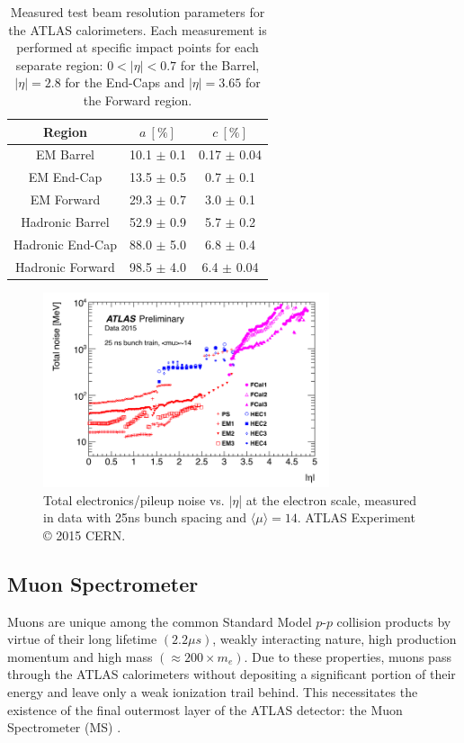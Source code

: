 \begin{table}
\centering
\begin{tabular}{|c|c|c|} 
\hline
Region & $a\ [\%]$ & $c\ [\%]$ \\
\hline\hline
EM Barrel & 10.1 $\pm$ 0.1 & 0.17 $\pm$ 0.04 \\
\hline
EM End-Cap & 13.5 $\pm$ 0.5 & 0.7 $\pm$ 0.1 \\
\hline
EM Forward & 29.3 $\pm$ 0.7 & 3.0 $\pm$ 0.1 \\
\hline
Hadronic Barrel & 52.9 $\pm$ 0.9 & 5.7 $\pm$ 0.2 \\
\hline
Hadronic End-Cap & 88.0 $\pm$ 5.0 & 6.8 $\pm$ 0.4 \\
\hline
Hadronic Forward & 98.5 $\pm$ 4.0 & 6.4 $\pm$ 0.04 \\
\hline
\end{tabular}
\caption{
    Measured test beam resolution parameters for the ATLAS calorimeters.
    Each measurement is performed at specific impact points for each separate region: $0 < |\eta| < 0.7$ for the Barrel, $|\eta| = 2.8$ for the End-Caps and $|\eta| = 3.65$ for the Forward region.
}
\label{tab:calo_res}
\end{table}

\begin{figure}
	\centering
	\includegraphics[width=0.75\textwidth]{calo_electronics_noise}
	\caption{Total electronics/pileup noise vs. $|\eta$| at the electron scale, measured in data with 25ns bunch spacing and $\langle \mu \rangle = 14$. ATLAS Experiment © 2015 CERN.}
	\label{fig:calo_noise}
\end{figure}

\subsection{Muon Spectrometer}
\label{sec:muon_spectrometer}
Muons are unique among the common Standard Model $p$-$p$ collision products by virtue of their long lifetime $(2.2 \mu s)$, weakly interacting nature, high production momentum and high mass $(\approx 200 \times m_e)$.
Due to these properties, muons pass through the ATLAS calorimeters without depositing a significant portion of their energy and leave only a weak ionization trail behind.
This necessitates the existence of the final outermost layer of the ATLAS detector: the Muon Spectrometer (MS) \cite{CERN-LHCC-97-022}.

